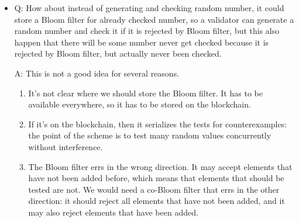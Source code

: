 \documentclass{article}
\begin{document}
\begin{itemize}
\item Q: How about instead of generating and checking random number, it could
  store a Bloom filter for already checked number, so a validator can
  generate a random number and check it if it is rejected by Bloom filter,
  but this also happen that there will be some number never get checked
  because it is rejected by Bloom filter, but actually never been checked.

  A: This is not a good idea for several reasons.
  \begin{enumerate}
  \item It's not clear where we should store the Bloom filter. It has to be available
    everywhere, so it has to be stored on the blockchain.
  \item If it's on the blockchain, then it serializes the tests for counterexamples:
    the point of the scheme is to test many random values concurrently without
    interference.
  \item The Bloom filter errs in the wrong direction. It may accept elements that have
    not been added before, which means that elements that should be tested are not. We
    would need a co-Bloom filter that errs in the other direction: it should reject all
    elements that have not been added, and it may also reject elements that have been added.
  \end{enumerate}

\end{itemize}
\end{document}
